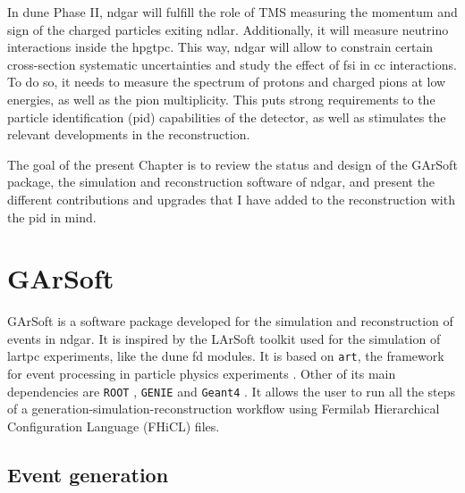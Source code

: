 In \gls{dune} Phase II, \gls{ndgar} will fulfill the role of TMS measuring the momentum and sign of the charged particles exiting \gls{ndlar}. Additionally, it will measure neutrino interactions inside the \gls{hpgtpc}. This way, \gls{ndgar} will allow to constrain certain cross-section systematic uncertainties and study the effect of \gls{fsi} in \gls{cc} interactions. To do so, it needs to measure the spectrum of protons and charged pions at low energies, as well as the pion multiplicity. This puts strong requirements to the particle identification (\gls{pid}) capabilities of the detector, as well as stimulates the relevant developments in the reconstruction.

The goal of the present Chapter is to review the status and design of the GArSoft package, the simulation and reconstruction software of \gls{ndgar}, and present the different contributions and upgrades that I have added to the reconstruction with the \gls{pid} in mind.

\section{GArSoft}\label{section:garsoft}

GArSoft is a software package developed for the simulation and reconstruction of events in \gls{ndgar}. It is inspired by the LArSoft toolkit \cite{Church2013} used for the simulation of \gls{lartpc} experiments, like the \gls{dune} \gls{fd} modules. It is based on \texttt{art}, the framework for event processing in particle physics experiments \cite{ART}. Other of its main dependencies are \texttt{ROOT} \cite{Brun1997}, \texttt{GENIE} \cite{Andreopoulos2009} and \texttt{Geant4} \cite{GEANT42002}. It allows the user to run all the steps of a generation-simulation-reconstruction workflow using Fermilab Hierarchical Configuration Language (FHiCL) files.

\subsection{Event generation}

